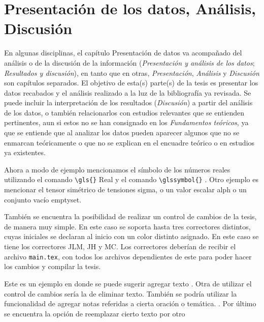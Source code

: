 \chapter{Presentación de los datos, Análisis, Discusión}

En algunas disciplinas, el capítulo Presentación de datos va acompañado del análisis o de la discusión de la información (\textit{Presentación y análisis de los datos}; \textit{Resultados y discusión}), en tanto que en otras, \textit{Presentación}, \textit{Análisis} y \textit{Discusión} son capítulos separados.
El objetivo de esta(s) parte(s) de la tesis es presentar los datos recabados y el análisis realizado a la luz de la bibliografía ya revisada. Se puede incluir la interpretación de los resultados (\textit{Discusión}) a partir del análisis de los datos, o también relacionarlos con estudios relevantes que se entienden pertinentes, aun si estos no se han consignado en los \textit{Fundamentos teóricos}, ya que se entiende que al analizar los datos pueden aparecer algunos que no se enmarcan teóricamente o que no se explican en el encuadre teórico o en estudios ya existentes.

Ahora a modo de ejemplo mencionamos el símbolo de los números reales utilizando el comando \verb|\gls{}| \gls{Real} y el comando \verb|\glssymbol{}| . Otro ejemplo es mencionar el tensor simétrico de tensiones \gls{sigma}, o un valor escalar  \gls{alph} o un conjunto vacío \gls{emptyset}.

También se encuentra la posibilidad de realizar un control de cambios de la tesis, de manera muy simple. En este caso se soporta hasta tres correctores distintos, cuyas iniciales se declaran al inicio con un color distinto asignado. En este caso se tiene los correctores \textcolor{redtex}{JLM}, \textcolor{bluetex}{JH} y \textcolor{greentex}{MC}. Los correctores deberían de recibir el archivo \verb|main.tex|, con todos los archivos dependientes de este para poder hacer los cambios y compilar la tesis. 

Este es un ejemplo en donde se puede sugerir agregar texto . Otra  de utilizar el control de cambios sería la de  eliminar texto. También se podría utilizar la funcionalidad de agregar notas referidas a cierta oración o temática. . Por último se encuentra la opción de reemplazar cierto texto por otro 

